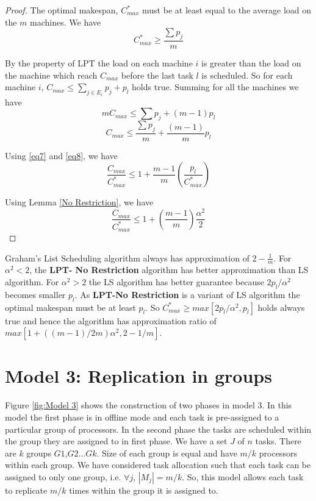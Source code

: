 \documentclass[10pt, conference, compsocconf]{IEEEtran}
\begin{document}
\begin{proof}
The optimal makespan, $C_{max}^{*}$ must be at least equal to the average load on the $m$ machines. We have
\begin{equation}\label{eq7}
C_{max}^{*}\geq\frac{\sum p_j}{m}
\end{equation}

By the property of LPT the load on each machine $i$ is greater than the load on the machine which reach $C_{max}$ before the last task $l$ is scheduled. So for each machine $i$, $C_{max} \leq  \sum_{j \in E_i}^{}{p_j} + p_l$ holds true.  Summing for all the machines we have
\begin{equation}\nonumber 
mC_{max} \leq  \sum {p_j} + (m-1)p_l
\end{equation}
\begin{equation}\label{eq8}
C_{max} \leq  \frac{\sum {p_j}}{m} + \frac{(m-1)}{m}p_l
\end{equation}

Using \ref{eq7} and \ref{eq8}, we have
\begin{equation}\nonumber
\frac{C_{max}}{C_{max}^{*}} \leq 1 + {\frac{m-1}{m}}\left(\frac{p_l}{C_{max}^{*}}\right)
\end{equation}

Using Lemma \ref{No Restriction}, we have 
\begin{equation}\nonumber
\frac{C_{max}}{C_{max}^{*}} \leq 1 + \left(\frac{m-1}{m}\right)\frac{\alpha^{2}}{2}
\end{equation}

\end{proof}  

Graham's List Scheduling algorithm always has approximation of $2-\frac{1}{m}$. For $\alpha^2 < 2$, the \textbf{LPT- No Restriction} algorithm has better approximation than LS algorithm. For $\alpha^2 > 2$ the LS algorithm has better guarantee because $2p_l/\alpha^2$ becomes smaller $p_l$. As \textbf{LPT-No Restriction} is a variant of LS algorithm the optimal makespan must be at least $p_l$. So  $C_{max}^{*}\geq max[2p_l/\alpha^2,p_l]$ holds always true and hence the algorithm has approximation ratio of $max[1 + ((m-1)/2m)\alpha^{2},2-1/m ]$.   



\section{Model 3: Replication in groups}\label{sec6}
Figure \ref{fig:Model 3} shows the construction of two phases in model 3.  In this model the first phase is in offline mode and each task is pre-assigned to a particular  group of processors. In the second phase the tasks are scheduled  within the group they are assigned to in first phase.   We have a set $J$ of $ n$ tasks.  There are $k$ groups $G1$,$G2$...$Gk$.   Size of each group is equal and have $m/k$ processors within each group.  We have considered task allocation such that each task can be assigned to only one group, i.e. $\forall j$, $|M_j|= m/k$. So, this model allows each task to replicate $ m/k $ times within the group it is assigned to.
\end{document}
